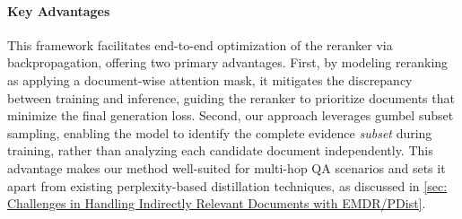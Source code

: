 \paragraph{Key Advantages} 
This framework facilitates end-to-end optimization of the reranker via backpropagation, offering two primary advantages. First, by modeling reranking as applying a document-wise attention mask, it mitigates the discrepancy between training and inference, guiding the reranker to prioritize documents that minimize the final generation loss. Second, our approach leverages gumbel subset sampling, enabling the model to identify the complete evidence \textit{subset} during training, rather than analyzing each candidate document independently. This advantage makes our method well-suited for multi-hop QA scenarios and sets it apart from existing perplexity-based distillation techniques, as discussed in \autoref{sec: Challenges in Handling Indirectly Relevant Documents with EMDR/PDist}.
